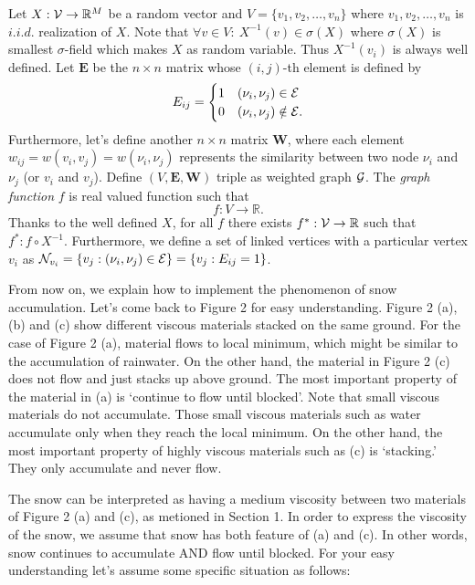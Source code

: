\documentclass[preprint, review, 12pt]{article}
\theoremstyle{definition}
\theoremstyle{remark}
\begin{document}
Let $X:{\cal V} \to \mathbb{R}^M$ be a random vector and $V=\{v_1,v_2,\dots,v_n\}$ where $v_1,v_2,\dots,v_n$ is $i.i.d.$ realization of $X$. Note that $\forall v \in V : ~ X^{-1}(v) \in \sigma(X)$ where $\sigma(X)$ is smallest $\sigma$-field which makes $X$ as random variable. Thus $X^{-1}(v_i)$ is always well defined. Let $\boldsymbol E$ be the $n \times n$ matrix whose $(i,j)$-th element is defined by 
$$E_{ij}=\begin{cases} 1 & (\nu_i,\nu_j)\in {\cal E} \\ 0 & (\nu_i,\nu_j) \notin {\cal E}.\end{cases}$$ Furthermore, let's define another $n\times n$ matrix $\boldsymbol W$, where each element $w_{ij}=w(v_i,v_j)=w(\nu_i,\nu_j)$ represents the similarity between two node $\nu_i$ and $\nu_j$ (or $v_i$ and $v_j$). Define $(V,{\boldsymbol E},{\boldsymbol W})$ triple as weighted graph ${\cal G}$. The \emph{graph function} $f$ is real valued function such that 
\[
f : V \to \mathbb{R}.
\]
Thanks to the well defined $X$, for all $f$ there exists $f^{\ast}: {\cal V} \to \mathbb{R}$ such that $f^{\ast}:f\circ X^{-1}$.
Furthermore, we define a set of linked vertices with a particular vertex $v_i$ as ${\cal N}_{v_i}=\{v_j: (\nu_i,\nu_j) \in {\cal E} \}=\{v_j:E_{ij}=1\}$.

From now on, we explain how to implement the phenomenon of snow accumulation. Let's come back to Figure 2 for easy understanding. Figure 2 (a), (b) and (c) show different viscous materials stacked on the same ground. For the case of Figure 2 (a), material flows to local minimum, which might be similar to the accumulation of rainwater. On the other hand, the material in Figure 2 (c) does not flow and just stacks up above ground. The most important property of the material in (a) is `continue to flow until blocked'. Note that small viscous materials do not accumulate. Those small viscous materials such as water accumulate only when they reach the local minimum. On the other hand, the most important property of highly viscous materials such as (c) is `stacking.' They only accumulate and never flow. 

The snow can be interpreted as having a medium viscosity between two materials of Figure 2 (a) and (c), as metioned in Section 1. In order to express the viscosity of the snow, we assume that snow has both feature of (a) and (c). In other words, snow continues to accumulate AND flow until blocked. 
For your easy understanding let's assume some specific situation as follows: 
\end{document}

